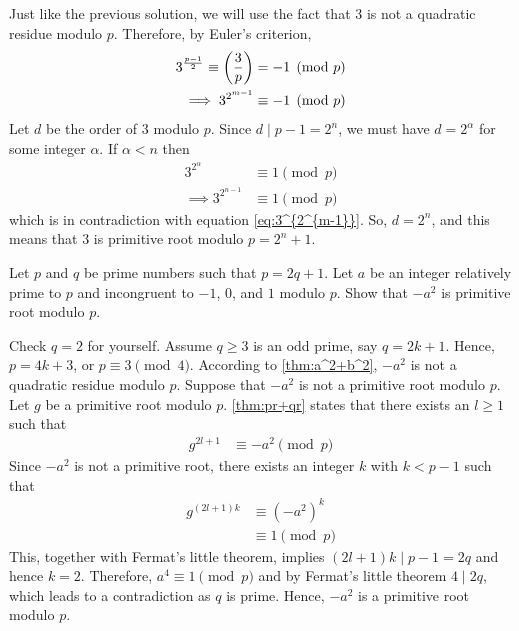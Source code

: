\begin{solution}[2]
	Just like the previous solution, we will use the fact that $3$ is not a quadratic residue modulo $p$. Therefore, by Euler's criterion,
		\begin{align}\label{eq:3^{2^{m-1}}}
			3^{\frac{p-1}{2}} \equiv \parenthesis{\frac{3}{p}}
				& = -1\pmod p\\
			\implies 3^{2^{m-1}}
				& \equiv -1 \pmod p
		\end{align}
	Let $d$ be the order of $3$ modulo $p$. Since $d\mid p-1=2^n$, we must have $d=2^{\alpha}$ for some integer $\alpha$. If $\alpha<n$ then
		\begin{align*}
			3^{2^{\alpha}}
				& \equiv 1\pmod{p}\\
			\implies 3^{2^{n-1}}
				& \equiv 1\pmod{p}
		\end{align*}
	which is in contradiction with equation \eqref{eq:3^{2^{m-1}}}. So, $d=2^n$, and this means that $3$ is primitive root modulo $p=2^n+1$.
\end{solution}

\begin{problem}
	Let $p$ and $q$ be prime numbers such that $ p=2q+1$. Let $a$ be an integer relatively prime to $p$ and incongruent to $-1$, $0$, and $1$ modulo $p$. Show that $ -a^2$ is primitive root modulo $p$.
\end{problem}

\begin{solution}
	Check $ q=2$ for yourself. Assume $ q \ge 3$ is an odd prime, say $q=2k+1$. Hence, $ p=4k+3$, or $p \equiv 3 \pmod 4$. According to \autoref{thm:a^2+b^2}, $ -a^2$ is not a quadratic residue modulo $ p$. Suppose that $ -a^2$ is not a primitive root modulo $p$. Let $ g$ be a primitive root modulo $p$. \autoref{thm:pr+qr} states that there exists an $ l\ge 1$ such that
		\begin{align*}
			g^{2l+1}
				& \equiv -a^2 \pmod p
		\end{align*}
	Since $-a^2$ is not a primitive root, there exists an integer $k$ with $ k<p-1$ such that
		\begin{align*}
			g^{(2l+1)k}
				& \equiv (-a^2)^k\\
				& \equiv 1 \pmod p
		\end{align*}
	This, together with Fermat's little theorem, implies $ (2l+1)k \mid p-1=2q$ and hence $ k=2$. Therefore, $ a^4 \equiv 1 \pmod p$ and by Fermat's little theorem $ 4\mid 2q$, which leads to a contradiction as $q$ is prime. Hence, $ -a^2$ is a primitive root modulo $p$.
\end{solution}

